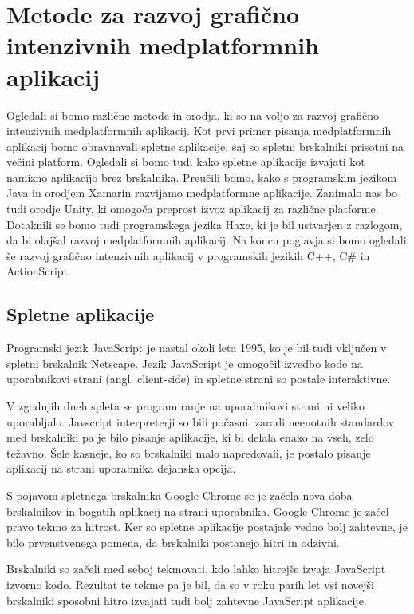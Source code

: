 \chapter{Metode za razvoj grafično intenzivnih medplatformnih aplikacij}

Ogledali si bomo različne metode in orodja, ki so na voljo za razvoj grafično intenzivnih medplatformnih aplikacij. Kot prvi primer pisanja medplatformnih aplikacij bomo obravnavali spletne aplikacije, saj so spletni brskalniki prisotni na večini platform. Ogledali si bomo tudi kako spletne aplikacije izvajati kot namizno aplikacijo brez brskalnika. Preučili bomo, kako s programskim jezikom Java in orodjem Xamarin razvijamo medplatformne aplikacije. Zanimalo nas bo tudi orodje Unity, ki omogoča preprost izvoz aplikacij za različne platforme. Dotaknili se bomo tudi programskega jezika Haxe, ki je bil ustvarjen z razlogom, da bi olajšal razvoj medplatformnih aplikacij. Na koncu poglavja si bomo ogledali še razvoj grafično intenzivnih aplikacij v programskih jezikih C++, C\# in ActionScript.

\section{Spletne aplikacije}
\label{sec:web}
Programski jezik JavaScript je nastal okoli leta 1995, ko je bil tudi vključen v spletni brskalnik Netscape. Jezik JavaScript je omogočil izvedbo kode na uporabnikovi strani (angl. client-side) in spletne strani so postale interaktivne.

V zgodnjih dneh spleta se programiranje na uporabnikovi strani ni veliko uporabljalo. Javscript interpreterji so bili počasni, zaradi neenotnih standardov med brskalniki pa je bilo pisanje aplikacije, ki bi delala enako na vseh, zelo težavno. Šele kasneje, ko so brskalniki malo napredovali, je postalo pisanje aplikacij na strani uporabnika dejanska opcija.

S pojavom spletnega brskalnika Google Chrome se je začela nova doba brskalnikov in bogatih aplikacij na strani uporabnika. Google Chrome je začel pravo tekmo za hitrost. Ker so spletne aplikacije postajale vedno bolj zahtevne, je bilo prvenstvenega pomena, da brskalniki postanejo hitri in odzivni.

Brskalniki so začeli med seboj tekmovati, kdo lahko hitrejše izvaja JavaScript izvorno kodo. Rezultat te tekme pa je bil, da so v roku parih let vsi novejši brskalniki sposobni hitro izvajati tudi bolj zahtevne JavaScript aplikacije. 

